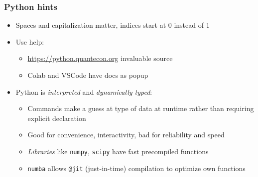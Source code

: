 \documentclass[bigger]{beamer}
\begin{document}
\begin{frame}%

\frametitle{Python hints}


\begin{itemize}

\item Spaces and capitalization matter, indices start at 0 instead of 1

\item Use help:

\begin{itemize}

\item \url{https://python.quantecon.org} invaluable source

\item Colab and VSCode have docs as popup
\end{itemize}

\item Python is \emph{interpreted} and \emph{dynamically typed}: 
\begin{itemize}
\item Commands make a guess at type of data at runtime rather than requiring explicit declaration
\item Good for convenience, interactivity, bad for reliability and speed
\item \emph{Libraries} like \texttt{numpy}, \texttt{scipy} have fast precompiled functions
\item \texttt{numba} allows \texttt{@jit} (just-in-time) compilation to optimize own functions
\end{itemize}


\end{itemize}


\end{frame}
\end{document}
